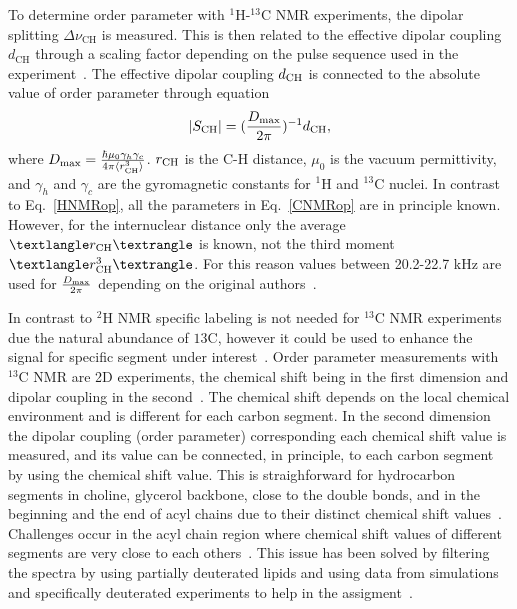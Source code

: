 \documentclass[aps,prl,superscriptaddress,twocolumn]{revtex4}
\begin{document}
To determine order parameter with $^1$H-$^{13}$C NMR experiments, the dipolar splitting $\Delta \nu_\mathrm{CH}$  is measured. This is then related to
the effective dipolar coupling $d_\mathrm{CH}$ through a scaling factor depending on the pulse sequence used in the 
experiment~\cite{hong95a,gross97,dvinskikh05a,ferreira13}. The effective dipolar coupling $d_{{\rm CH}}$ is 
connected to the absolute value of order parameter through equation
\begin{equation}\label{CNMRop}
|S_{{\rm CH}}|=(\frac{D_{{\rm max}}}{2\pi})^{-1}d_\mathrm{CH},
\end{equation}
where $D_{{\rm max}} = \frac{\hbar \mu_0 \gamma_h \gamma_c}{4\pi\langle r_\mathrm{CH}^3 \rangle}$. 
$r_{{\rm CH}}$ is the C-H distance, $\mu_0$ is the vacuum permittivity, and $\gamma_h$ and $\gamma_c$ are 
the gyromagnetic constants for $^1$H and $^{13}$C nuclei. In contrast to Eq.~\ref{HNMRop}, all the parameters in 
Eq.~\ref{CNMRop} are in principle known. However, for the internuclear distance only the average $⟨r_{{\rm CH}}⟩$ 
is known, not the third moment $⟨r^3_{{\rm CH}}⟩$. For this reason values between 20.2-22.7 kHz are used for
$\frac{D_{{\rm max}}}{2\pi}$ depending on the original authors~\cite{hong95a,gross97,dvinskikh05a,becker05,ferreira13,ferreira15}.

In contrast to $^2$H NMR specific labeling is not needed for $^{13}$C NMR experiments due the 
natural abundance of $ {13}$C, however it could be used to enhance the signal for specific 
segment under interest~\cite{sivanandam09}. Order parameter measurements with $^{13}$C NMR are
2D experiments, the chemical shift being in the first dimension and dipolar coupling 
in the second~\cite{hong95a,gross97,dvinskikh05a,ferreira13}. The chemical shift depends on the local chemical environment and 
is different for each carbon segment. In the second dimension the dipolar coupling
(order parameter) corresponding each chemical shift value is measured, and its value 
can be connected, in principle, to each carbon segment by using the chemical shift value.  
This is straighforward for hydrocarbon segments in choline, glycerol backbone, close to the 
double bonds, and in the beginning and the end of acyl chains due to their distinct chemical 
shift values~\cite{hong95a,gross97,dvinskikh05a,ferreira13,leftin14}.
Challenges occur in the acyl chain region where chemical shift values 
of different segments are very close to each others~\cite{hong95a,gross97,dvinskikh05a,ferreira13,leftin14}. 
This issue has been solved by filtering the spectra by using partially deuterated lipids \cite{ferreira13}
and using data from simulations and specifically deuterated experiments to help in 
the assigment~\cite{ferreira13,leftin14}. 
\end{document}
